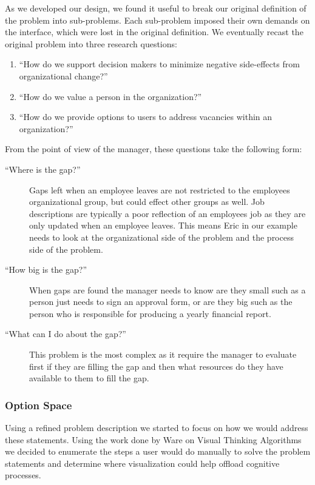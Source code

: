 \documentclass[journal]{vgtc}                %
\begin{document}
As we developed our design, we found it useful to break our original definition of the problem into sub-problems. Each sub-problem imposed their own demands on the interface, which were lost in the original definition. We eventually recast the original problem into three research questions: 

\begin{enumerate}
\item “How do we support decision makers to minimize negative side-effects from organizational change?”
\item “How do we value a person in the organization?”
\item “How do we provide options to users to address vacancies within an organization?”
\end{enumerate}

From the point of view of the manager, these questions take the following form: 

\begin{description}


\item [``Where is the gap?''] Gaps left when an employee leaves are not restricted to the employees organizational group, but could effect other groups as well.  Job descriptions are typically a poor reflection of an employees job as they are only updated when an employee leaves.  This means Eric in our example needs to look at the organizational side of the problem and the process side of the problem.
\item [``How big is the gap?''] When gaps are found the manager needs to know are they small such as a person just needs to sign an approval form, or are they big such as the person who is responsible for producing a yearly financial report.

\item [``What can I do about the gap?''] This problem is the most complex as it require the manager to evaluate first if they are filling the gap and then what resources do they have available to them to fill the gap.
\end{description}

\subsubsection{Option Space}
Using a refined problem description we started to focus on how we would address these statements.  Using the work done by Ware on Visual Thinking Algorithms~\cite[Chapter 11]{ware2012information} we decided to enumerate the steps a user would do manually to solve the problem statements and determine where visualization could help offload cognitive processes.
\end{document}
